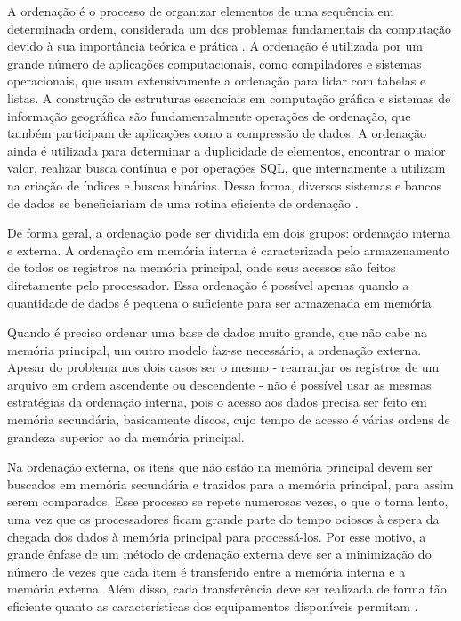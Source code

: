 A ordenação é o processo de organizar elementos de uma sequência em determinada ordem, considerada um dos problemas fundamentais da computação devido à sua importância teórica e prática \cite{Knuth:1998, Cormen:2009}. 
A ordenação é utilizada por um grande número de aplicações computacionais, como compiladores e sistemas operacionais, que usam extensivamente a ordenação para lidar com tabelas e listas. 
A construção de estruturas essenciais em computação gráfica e sistemas de informação geográfica são fundamentalmente operações de ordenação, que também participam de aplicações como a compressão de dados. A ordenação ainda é utilizada para determinar a duplicidade de elementos, encontrar o maior valor, realizar busca contínua e por operações SQL, que internamente a utilizam na criação de índices e buscas binárias. Dessa forma, diversos sistemas e bancos de dados se beneficiariam de uma rotina eficiente de ordenação \cite{Lauterbach:2009, Satish:2009 , Dean:2008}.




De forma geral, a ordenação pode ser dividida em dois grupos: ordenação interna e externa. 
A ordenação em memória interna é caracterizada pelo armazenamento de todos os registros na memória principal, onde seus acessos são feitos diretamente pelo processador. Essa ordenação é possível apenas quando a quantidade de dados é pequena o suficiente para ser armazenada em memória. 

Quando é preciso ordenar uma base de dados muito grande, que não cabe na memória principal, um outro modelo faz-se necessário, a ordenação externa.
Apesar do problema nos dois casos ser o mesmo - rearranjar os registros de um arquivo em ordem ascendente ou descendente - não é possível usar as mesmas estratégias da ordenação interna, pois o acesso aos dados precisa ser feito em memória secundária, basicamente discos, cujo tempo de acesso é várias ordens de grandeza superior ao da memória principal.  %

Na ordenação externa, os itens que não estão na memória principal devem ser buscados em memória secundária e trazidos para a memória principal, para assim serem comparados. Esse processo se repete numerosas vezes, o que o torna lento, uma vez que os processadores ficam grande parte do tempo ociosos à espera da chegada dos dados à memória principal para processá-los. Por esse motivo, a grande ênfase de um método de ordenação externa deve ser a minimização do número de vezes que cada item é transferido entre a memória interna e a memória externa. Além disso, cada transferência deve ser realizada de forma tão eficiente quanto as características dos equipamentos disponíveis permitam \cite{Ziviani:2007}.



